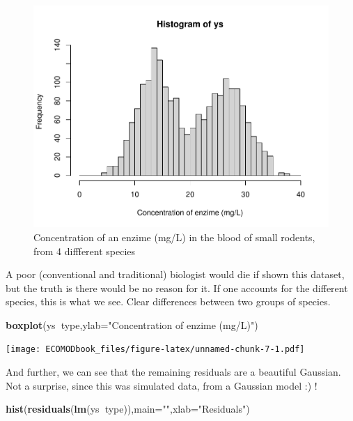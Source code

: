 \documentclass[
]{book}
\newenvironment{Shaded}{\begin{snugshade}}{\end{snugshade}}
\newcommand{\DataTypeTok}[1]{\textcolor[rgb]{0.13,0.29,0.53}{#1}}
\newcommand{\KeywordTok}[1]{\textcolor[rgb]{0.13,0.29,0.53}{\textbf{#1}}}
\newcommand{\NormalTok}[1]{#1}
\newcommand{\OperatorTok}[1]{\textcolor[rgb]{0.81,0.36,0.00}{\textbf{#1}}}
\newcommand{\StringTok}[1]{\textcolor[rgb]{0.31,0.60,0.02}{#1}}
\begin{document}
\begin{figure}

{\centering \includegraphics[width=0.8\linewidth]{ECOMODbook_files/figure-latex/figrodents-1} 

}

\caption{Concentration of an enzime (mg/L) in the blood of small rodents, from 4 diffferent species}\label{fig:figrodents}
\end{figure}

A poor (conventional and traditional) biologist would die if shown this dataset, but the truth is there would be no reason for it. If one accounts for the different species, this is what we see. Clear differences between two groups of species.

\begin{Shaded}
\begin{Highlighting}[]
\KeywordTok{boxplot}\NormalTok{(ys}\OperatorTok{~}\NormalTok{type,}\DataTypeTok{ylab=}\StringTok{"Concentration of enzime (mg/L)"}\NormalTok{)}
\end{Highlighting}
\end{Shaded}

\texttt{[image: ECOMODbook\_files/figure-latex/unnamed-chunk-7-1.pdf]}

And further, we can see that the remaining residuals are a beautiful Gaussian. Not a surprise, since this was simulated data, from a Gaussian model :) !

\begin{Shaded}
\begin{Highlighting}[]
\KeywordTok{hist}\NormalTok{(}\KeywordTok{residuals}\NormalTok{(}\KeywordTok{lm}\NormalTok{(ys}\OperatorTok{~}\NormalTok{type)),}\DataTypeTok{main=}\StringTok{""}\NormalTok{,}\DataTypeTok{xlab=}\StringTok{"Residuals"}\NormalTok{)}
\end{Highlighting}
\end{Shaded}
\end{document}
